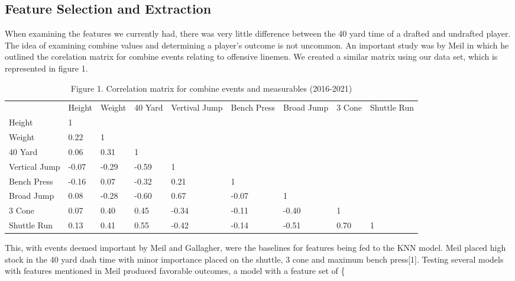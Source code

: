 \documentclass[confrence]{IEEEtran}
\begin{document}
\subsection*{Feature Selection and Extraction}
When examining the features we currently had, there was very little difference between the 40 yard time of a drafted and undrafted player.
The idea of examining combine values and determining a player's outcome is not uncommon.
An important study was by Meil in which he outlined the corelation matrix for combine events relating to offensive linemen.
We created a similar matrix using our data set, which is represented in figure 1.
\begin{table*}[htbp]
    \begin{tabular}{lllllllll}
                      & Height & Weight & 40 Yard & Vertival Jump & Bench Press & Broad Jump & 3 Cone & Shuttle Run \\
        Height        & 1      &        &         &               &             &            &        &             \\
        Weight        & 0.22   & 1      &         &               &             &            &        &             \\
        40 Yard       & 0.06   & 0.31   & 1       &               &             &            &        &             \\
        Vertical Jump & -0.07  & -0.29  & -0.59   & 1             &             &            &        &             \\
        Bench Press   & -0.16  & 0.07   & -0.32   & 0.21          & 1           &            &        &             \\
        Broad Jump    & 0.08   & -0.28  & -0.60   & 0.67          & -0.07       & 1          &        &             \\
        3 Cone        & 0.07   & 0.40   & 0.45    & -0.34         & -0.11       & -0.40      & 1      &             \\
        Shuttle Run   & 0.13   & 0.41   & 0.55    & -0.42         & -0.14       & -0.51      & 0.70   & 1
    \end{tabular}
    \caption*{Figure 1. Correlation matrix for combine events and measurables (2016-2021)}
\end{table*}
This, with events deemed important by Meil and Gallagher, were the baselines for features being fed to the KNN model.
Meil placed high stock in the 40 yard dash time with minor importance placed on the shuttle, 3 cone and maximum bench press[1].
Testing several models with features mentioned in Meil produced favorable outcomes, a model with a feature set of \{
\end{document}
